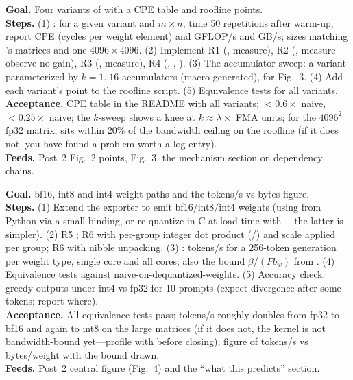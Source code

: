 \textbf{Goal.} Four variants of  with a CPE table and roofline points.\\
\textbf{Steps.} (1) : for a given variant and $m\times n$, time 50 repetitions after warm-up, report CPE (cycles per weight element) and GFLOP/s and GB/s; sizes matching 's matrices and one $4096\times 4096$. (2) Implement R1 (, measure), R2 (, measure---observe no gain), R3 (, measure), R4 (, , ). (3) The accumulator sweep: a variant parameterized by $k=1..16$ accumulators (macro-generated), for Fig.~3. (4) Add each variant's point to the roofline script. (5) Equivalence tests for all variants.\\
\textbf{Acceptance.} CPE table in the README with all variants;  $< 0.6\times$ naive,  $< 0.25\times$ naive; the $k$-sweep shows a knee at $k \approx \lambda \times$ FMA units; for the $4096^2$ fp32 matrix,  sits within 20\% of the bandwidth ceiling on the roofline (if it does not, you have found a problem worth a log entry).\\
\textbf{Feeds.} Post~2 Fig.~2 points, Fig.~3, the mechanism section on dependency chains.

\textbf{Goal.} bf16, int8 and int4 weight paths and the tokens/s-vs-bytes figure.\\
\textbf{Steps.} (1) Extend the exporter to emit bf16/int8/int4 weights (using  from Python via a small  binding, or re-quantize in C at load time with ---the latter is simpler). (2) R5 ; R6  with per-group integer dot product (/) and scale applied per group; R6  with nibble unpacking. (3) : tokens/s for a 256-token generation per weight type, single core and all cores; also the bound $\beta/(Pb_w)$ from . (4) Equivalence tests against naive-on-dequantized-weights. (5) Accuracy check: greedy outputs under int4 vs fp32 for 10 prompts (expect divergence after some tokens; report where).\\
\textbf{Acceptance.} All equivalence tests pass; tokens/s roughly doubles from fp32 to bf16 and again to int8 on the large matrices (if it does not, the kernel is not bandwidth-bound yet---profile with  before closing); figure of tokens/s vs bytes/weight with the bound drawn.\\
\textbf{Feeds.} Post~2 central figure (Fig.~4) and the ``what this predicts'' section.

